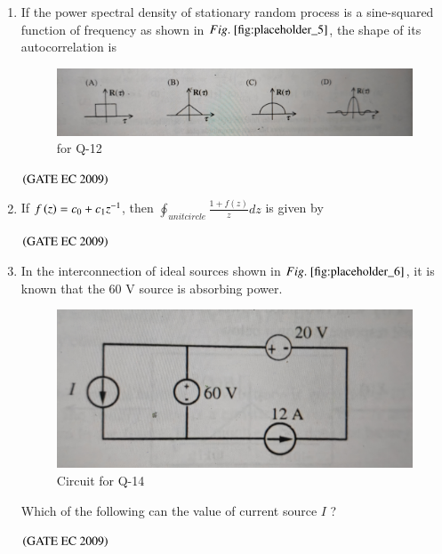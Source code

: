 \documentclass[journal,12pt,onecolumn]{IEEEtran}
\theoremstyle{remark}
\begin{document}
\begin{enumerate}[start=1, label={Q\arabic*.}]
\item If the power spectral density of stationary random process is a sine-squared function of frequency as shown in $\figref{fig:placeholder_5}$, the shape of its autocorrelation is

\begin{figure}[H]
    \centering
    \includegraphics[width=0.5\columnwidth]{figs/img_5.jpg}
    \caption{\centering for Q-12}
    \label{fig:placeholder_5}
\end{figure}
\hfill $\left(\text{GATE EC 2009}\right)$



\item If $f\left(z\right) = c_0 + c_1z^{-1}$, then $\oint_{unit circle} \frac{1+f(z)}{z} dz$ is given by

\begin{enumerate}
\end{enumerate}
\hfill $\left(\text{GATE EC 2009}\right)$

\item In the interconnection of ideal sources shown in $\figref{fig:placeholder_6}$, it is known that the 60 V source is absorbing power.
\begin{figure}[H]
    \centering
    \includegraphics[width=0.5\columnwidth]{figs/img_6.jpg}
    \caption{\centering Circuit for Q-14}
    \label{fig:placeholder_6}
\end{figure}
Which of the following can the value of current source ${I}$ ?

\begin{enumerate}
\end{enumerate}
\hfill $\left(\text{GATE EC 2009}\right)$


\end{enumerate}
\end{document}
